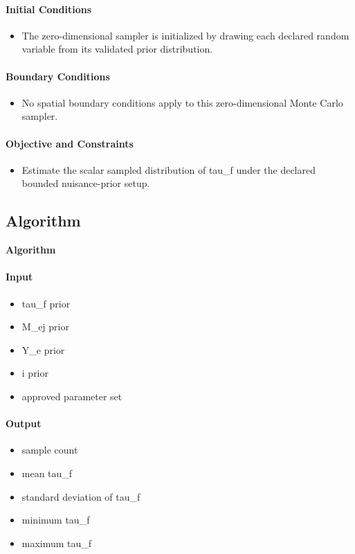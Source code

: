 \documentclass[11pt]{article}
\begin{document}
\paragraph{Initial Conditions}
\begin{itemize}\raggedright
\item The zero-dimensional sampler is initialized by drawing each declared random variable from its validated prior distribution.
\end{itemize}

\paragraph{Boundary Conditions}
\begin{itemize}\raggedright
\item No spatial boundary conditions apply to this zero-dimensional Monte Carlo sampler.
\end{itemize}

\paragraph{Objective and Constraints}
\begin{itemize}\raggedright
\item Estimate the scalar sampled distribution of tau\_\allowbreak{}f under the declared bounded nuisance-prior setup.
\end{itemize}

\subsection{Algorithm}

\noindent\textbf{Algorithm}
\paragraph{Input}
\begin{itemize}\raggedright
\item tau\_\allowbreak{}f prior
\item M\_\allowbreak{}ej prior
\item Y\_\allowbreak{}e prior
\item i prior
\item approved parameter set
\end{itemize}
\paragraph{Output}
\begin{itemize}\raggedright
\item sample count
\item mean tau\_\allowbreak{}f
\item standard deviation of tau\_\allowbreak{}f
\item minimum tau\_\allowbreak{}f
\item maximum tau\_\allowbreak{}f
\end{itemize}
\end{document}
